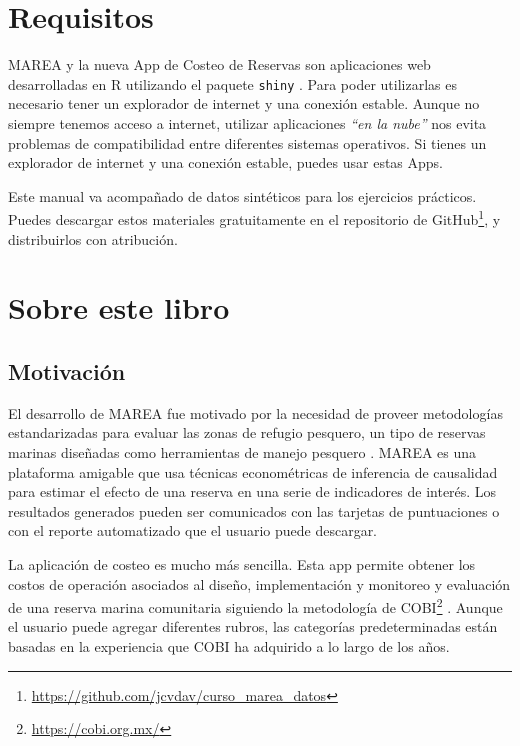 \documentclass[]{krantz}
\renewcommand{\href}[2]{#2\footnote{\url{#1}}}
\begin{document}
\hypertarget{requisitos}{%
\section{Requisitos}\label{requisitos}}

MAREA y la nueva App de Costeo de Reservas son aplicaciones web
desarrolladas en R utilizando el paquete \texttt{shiny}
\citep{R-base, R-shiny}. Para poder utilizarlas es necesario tener un
explorador de internet y una conexión estable. Aunque no siempre tenemos
acceso a internet, utilizar aplicaciones \emph{``en la nube''} nos evita
problemas de compatibilidad entre diferentes sistemas operativos. Si
tienes un explorador de internet y una conexión estable, puedes usar
estas Apps.

Este manual va acompañado de datos sintéticos para los ejercicios
prácticos. Puedes descargar estos materiales gratuitamente en el
\href{https://github.com/jcvdav/curso_marea_datos}{repositorio de
GitHub}, y distribuirlos con atribución.

\hypertarget{sobre-este-libro}{%
\section{Sobre este libro}\label{sobre-este-libro}}

\hypertarget{motivacion}{%
\subsection{Motivación}\label{motivacion}}

El desarrollo de MAREA fue motivado por la necesidad de proveer
metodologías estandarizadas para evaluar las zonas de refugio pesquero,
un tipo de reservas marinas diseñadas como herramientas de manejo
pesquero \citep{nom}. MAREA es una plataforma amigable que usa técnicas
econométricas de inferencia de causalidad para estimar el efecto de una
reserva en una serie de indicadores de interés. Los resultados generados
pueden ser comunicados con las tarjetas de puntuaciones o con el reporte
automatizado que el usuario puede descargar.

La aplicación de costeo es mucho más sencilla. Esta app permite obtener
los costos de operación asociados al diseño, implementación y monitoreo
y evaluación de una reserva marina comunitaria siguiendo la metodología
de \href{https://cobi.org.mx/}{COBI} \citep{uribe_2010}. Aunque el
usuario puede agregar diferentes rubros, las categorías predeterminadas
están basadas en la experiencia que COBI ha adquirido a lo largo de los
años.
\end{document}
